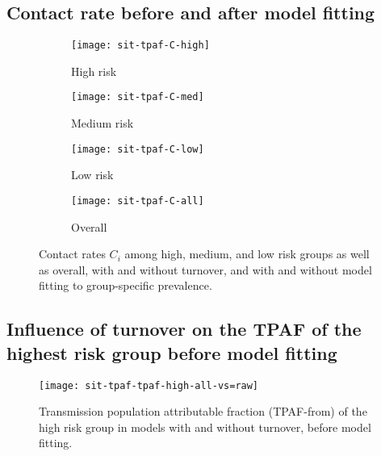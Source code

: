 \subsection{Contact rate before and after model fitting}
\begin{figure}[H]
  \centering
  \begin{subfigure}{0.45\linewidth}
    \centering\texttt{[image: sit-tpaf-C-high]}
    \caption{High risk}
    \label{fig:tpaf-C-high}
  \end{subfigure}
  \begin{subfigure}{0.45\linewidth}
    \centering\texttt{[image: sit-tpaf-C-med]}
    \caption{Medium risk}
    \label{fig:tpaf-C-med}
  \end{subfigure}
  \begin{subfigure}{0.45\linewidth}
    \centering\texttt{[image: sit-tpaf-C-low]}
    \caption{Low risk}
    \label{fig:tpaf-C-low}
  \end{subfigure}
  \begin{subfigure}{0.45\linewidth}
    \centering\texttt{[image: sit-tpaf-C-all]}
    \caption{Overall}
    \label{fig:tpaf-C-all}
  \end{subfigure}
  \caption{Contact rates $C_i$ among high, medium, and low risk groups as well as overall,
    with and without turnover,
    and with and without model fitting to group-specific prevalence.}
  \label{fig:tpaf-C}
\end{figure}
\subsection{Influence of turnover on the TPAF of the highest risk group before model fitting}
\begin{figure}[H]
  \centering
  \texttt{[image: sit-tpaf-tpaf-high-all-vs=raw]}
  \caption{Transmission population attributable fraction (TPAF-from)
    of the high risk group in models with and without turnover,
    before model fitting.}
  \label{fig:tpaf-raw}
\end{figure}
